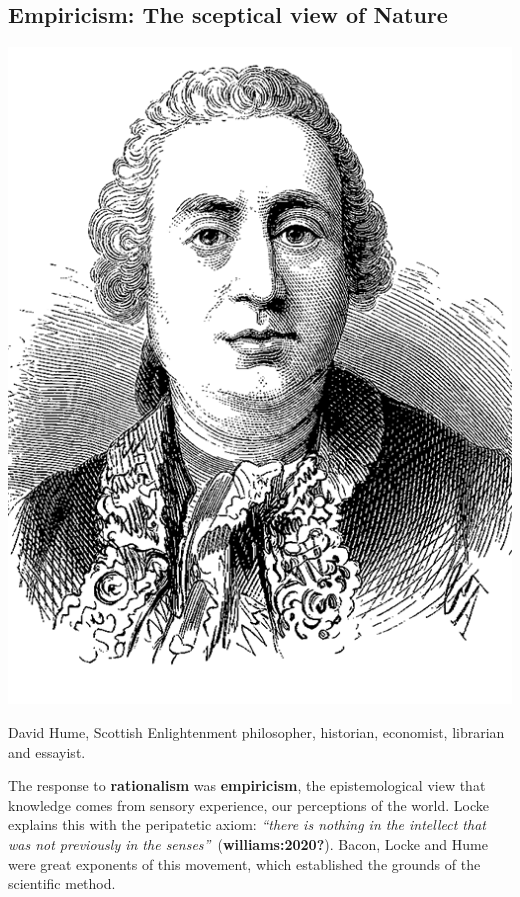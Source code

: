 \documentclass[
  letterpaper,
  DIV=11,
  numbers=noendperiod,
  oneside]{scrreprt}
\begin{document}
\hypertarget{sec-empiricism}{%
\subsection{Empiricism: The sceptical view of
Nature}\label{sec-empiricism}}

\begin{marginfigure}

{\centering \includegraphics{imgs/hume.png}

}

\caption{\label{fig-hume}David Hume, Scottish Enlightenment philosopher,
historian, economist, librarian and essayist.}

\end{marginfigure}

The response to \textbf{rationalism} was \textbf{empiricism}, the
epistemological view that knowledge comes from sensory experience, our
perceptions of the world. Locke explains this with the peripatetic
axiom: \emph{``there is nothing in the intellect that was not
previously in the senses''}~(\textbf{williams:2020?}). Bacon, Locke and
Hume were great exponents of this movement, which established the
grounds of the scientific method.
\end{document}
